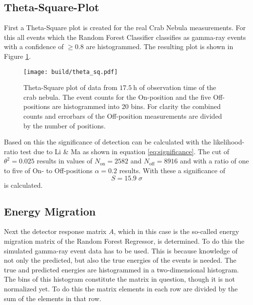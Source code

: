         \subsection{Theta-Square-Plot}
            First a Theta-Square plot is created for the real Crab Nebula measurements.
            For this all events which the Random Forest Classifier classifies as gamma-ray events with a confidence of $\geq \num{0.8}$ are histogrammed.
            The resulting plot is shown in Figure \ref{fig:theta_sq}.
            \begin{figure}
                \centering
                \texttt{[image: build/theta\_sq.pdf]}
                \caption{
                    Theta-Square plot of data from $\SI{17.5}{\hour}$ of observation time of the crab nebula.
                    The event counts for the On-position and the five Off-positions are histogrammed into 20 bins.
                    For clarity the combined counts and errorbars of the Off-position measurements are divided by the number of positions.
                }
                \label{fig:theta_sq}
            \end{figure}
            Based on this the significance of detection can be calculated with the likelihood-ratio test due to Li \& Ma \cite{} as shown in equation \eqref{eq:significance}.
            The cut of $\theta^2 = 0.025$ results in values of $N_\text{on} = 2582$ and $N_\text{off} = 8916$ and with a ratio of one to five of On- to Off-positions $\alpha = 0.2$ results.
            With these a significance of
            \begin{equation}
                S = 15.9 \; \sigma
            \end{equation}
            is calculated.
            

        
        \subsection{Energy Migration}
            Next the detector response matrix $A$, which in this case is the so-called energy migration matrix of the Random Forest Regressor, is determined.
            To do this the simulated gamma-ray event data has to be used.
            This is because knowledge of not only the predicted, but also the true energies of the events is needed.
            The true and predicted energies are histogrammed in a two-dimensional histogram.
            The bins of this histogram constitute the matrix in question, though it is not normalized yet.
            To do this the matrix elements in each row are divided by the sum of the elements in that row.
